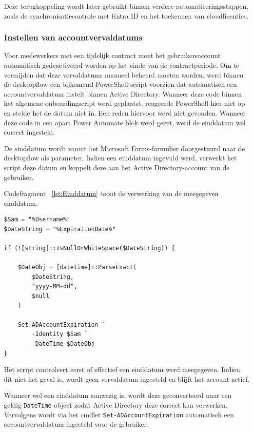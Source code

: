 Deze terugkoppeling wordt later gebruikt binnen verdere automatiseringsstappen, zoals de synchronisatiecontrole met Entra ID en het toekennen van cloudlicenties.

\subsubsection{Instellen van accountvervaldatums}

Voor medewerkers met een tijdelijk contract moet het gebruikersaccount automatisch gedeactiveerd worden op het einde van de contractperiode. Om te vermijden dat deze vervaldatums manueel beheerd moeten worden, werd binnen de desktopflow een bijkomend PowerShell-script voorzien dat automatisch een accountvervaldatum instelt binnen Active Directory. Wanneer deze code binnen het algemene onboardingscript werd geplaatst, reageerde PowerShell hier niet op en stelde het de datum niet in. Een reden hiervoor werd niet gevonden. Wanneer deze code in een apart Power Automate blok werd gezet, werd de einddatum wel correct ingesteld. 

De einddatum wordt vanuit het Microsoft Forms-formulier doorgestuurd naar de desktopflow als parameter. Indien een einddatum ingevuld werd, verwerkt het script deze datum en koppelt deze aan het Active Directory-account van de gebruiker.

Codefragment ~\ref{lst:Einddatum} toont de verwerking van de meegegeven einddatum.

\begin{listing}[ht]
\begin{verbatim}
$Sam = "%Username%"
$DateString = "%ExpirationDate%"

if (![string]::IsNullOrWhiteSpace($DateString)) {

    $DateObj = [datetime]::ParseExact(
        $DateString,
        "yyyy-MM-dd",
        $null
    )

    Set-ADAccountExpiration `
        -Identity $Sam `
        -DateTime $DateObj
}
\end{verbatim}
\caption{Verwerking van de mogelijke einddatum}
\label{lst:Einddatum}
\end{listing}

Het script controleert eerst of effectief een einddatum werd meegegeven. Indien dit niet het geval is, wordt geen vervaldatum ingesteld en blijft het account actief.\newline

Wanneer wel een einddatum aanwezig is, wordt deze geconverteerd naar een geldig \texttt{DateTime}-object zodat Active Directory deze correct kan verwerken. Vervolgens wordt via het cmdlet \texttt{Set-ADAccountExpiration} automatisch een accountvervaldatum ingesteld voor de gebruiker.

